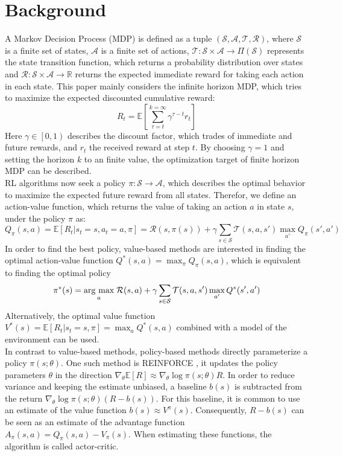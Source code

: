     \section{Background}
    A Markov Decision Process (MDP) is defined as a tuple $(\mathcal{S}, \mathcal{A}, \mathcal{T},\mathcal{R})$, where $\mathcal{S}$ is a finite set of states, $\mathcal{A}$ is a finite set of actions, $\mathcal{T}:\mathcal{S} \times \mathcal{A} \rightarrow \Pi(\mathcal{S})$ represents the state transition function, which returns a probability distribution over states and 
    $\mathcal{R}:\mathcal{S} \times \mathcal{A} \rightarrow \mathbb{R}$ returns the expected immediate reward for taking each action in each state. 
    This paper mainly considers the infinite horizon MDP, which tries to maximize the expected discounted cumulative reward:
    \[
    R_t = \mathbb{E} \left[ \sum_{\tau=t}^{k=\infty} \gamma^{\tau-t} r_t \right]
	\]
    Here $\gamma \in \left[0,1\right)$ describes the discount factor, which trades of immediate and future rewards, and $r_t$ the received reward at step $t$.
    By choosing $\gamma=1$ and setting the horizon $k$ to an finite value, the optimization target of finite horizon MDP can be described.\\
    RL algorithms now seek a policy $\pi:\mathcal{S} \rightarrow \mathcal{A}$, which describes the optimal behavior to maximize the expected future reward from all states.
    Therefor, we define an action-value function, which returns the value of taking an action $a$ in state $s$, under the policy $\pi$ as:
    \[
    Q_\pi(s,a) = \mathbb{E}\left[R_t|s_t =s,a_t=a,\pi\right] =\mathcal{R}(s,\pi(s)) + \gamma \sum_{s\in\mathcal{S}}\mathcal{T}(s,a,s') \max_{a'}Q_\pi(s',a')
	\]
    In order to find the best policy, value-based methods are interested in finding the optimal action-value function $Q^*(s,a) =\max_\pi Q_\pi(s,a)$, which is equivalent to finding the optimal policy 
    \[
	\pi^*(s) = \underset{a}{\operatorname{arg}\,\operatorname{max}}\; \mathcal{R}(s,a) + \gamma \sum_{s\in\mathcal{S}}\mathcal{T}(s,a,s') \max_{a'}Q^*(s',a')
    \]
    Alternatively, the optimal value function $V^*(s) = \mathbb{E}\left[R_t|s_t=s, \pi\right] = \max_{a} Q^*(s,a)$ combined with a model of the environment can be used.\\
    In contrast to value-based methods, policy-based methods directly parameterize a policy $\pi(s;\theta)$. 
    One such method is REINFORCE \cite{Williams1992}, it updates the policy parameters $\theta$ in the direction $\nabla_\theta \mathbb{E}[R]\approx \nabla_\theta\log\pi(s;\theta)R$.
    In order to reduce variance and keeping the estimate unbiased, a baseline $b(s)$ is subtracted from the return $\nabla_\theta\log\pi(s;\theta)(R - b(s))$. 
    For this baseline, it is common to use an estimate of the value function $b(s)\approx V^\pi(s)$.
    Consequently, $R-b(s)$ can be seen as an estimate of the advantage function $A_\pi(s,a) = Q_\pi(s,a) - V_\pi(s)$.
    When estimating these functions, the algorithm is called actor-critic. 
    
